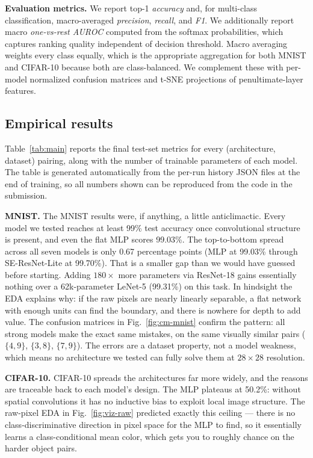 \documentclass[conference,10pt]{IEEEtran}
\begin{document}
\noindent\textbf{Evaluation metrics.} We report top-1 \emph{accuracy}
and, for multi-class classification, macro-averaged
\emph{precision}, \emph{recall}, and \emph{F1}. We additionally
report macro \emph{one-vs-rest AUROC} computed from the softmax
probabilities, which captures ranking quality independent of decision
threshold. Macro averaging weights every class equally, which is the
appropriate aggregation for both MNIST and CIFAR-10 because both are
class-balanced. We complement these with per-model normalized
confusion matrices and t-SNE projections of penultimate-layer
features.

\subsection{Empirical results}



Table~\ref{tab:main} reports the final test-set metrics for every
(architecture, dataset) pairing, along with the number of trainable
parameters of each model. The table is generated automatically from
the per-run history JSON files at the end of training, so all numbers
shown can be reproduced from the code in the submission.

\noindent\textbf{MNIST.} The MNIST results were, if anything, a little
anticlimactic. Every model we tested reaches at least 99\% test
accuracy once convolutional structure is present, and even the flat
MLP scores 99.03\%. The top-to-bottom spread across all seven models
is only 0.67 percentage points (MLP at 99.03\% through SE-ResNet-Lite
at 99.70\%). That is a smaller gap than we would have guessed before
starting. Adding $180\times$ more parameters via ResNet-18 gains
essentially nothing over a 62k-parameter LeNet-5 (99.31\%) on this
task. In hindsight the EDA explains why: if the raw pixels are nearly
linearly separable, a flat network with enough units can find the
boundary, and there is nowhere for depth to add value. The confusion
matrices in Fig.~\ref{fig:cm-mnist} confirm the pattern: all strong
models make the exact same mistakes, on the same visually similar
pairs ($\{4,9\}$, $\{3,8\}$, $\{7,9\}$). The errors are a dataset
property, not a model weakness, which means no architecture we tested
can fully solve them at $28\!\times\!28$ resolution.

\noindent\textbf{CIFAR-10.} CIFAR-10 spreads the architectures far
more widely, and the reasons are traceable back to each model's design.
The MLP plateaus at 50.2\%: without spatial convolutions it has no
inductive bias to exploit local image structure. The raw-pixel EDA
in Fig.~\ref{fig:viz-raw} predicted exactly this ceiling --- there is
no class-discriminative direction in pixel space for the MLP to find,
so it essentially learns a class-conditional mean color, which gets
you to roughly chance on the harder object pairs.
\end{document}
